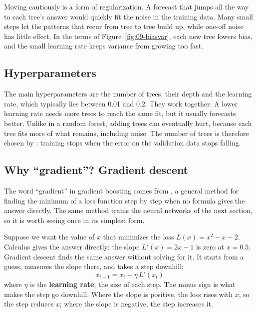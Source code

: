 Moving cautiously is a form of regularization. A forecast that jumps all the way to each tree's answer would quickly fit the noise in the training data. Many small steps let the patterns that recur from tree to tree build up, while one-off noise has little effect. In the terms of Figure~\ref{fig:09-biasvar}, each new tree lowers bias, and the small learning rate keeps variance from growing too fast.

\subsection{Hyperparameters}

The main hyperparameters are the number of trees, their depth and the learning rate, which typically lies between 0.01 and 0.2. They work together. A lower learning rate needs more trees to reach the same fit, but it usually forecasts better. Unlike in a random forest, adding trees can eventually hurt, because each tree fits more of what remains, including noise. The number of trees is therefore chosen by : training stops when the error on the validation data stops falling.

\subsection{Why ``gradient''? Gradient descent}

The word ``gradient'' in gradient boosting comes from , a general method for finding the minimum of a loss function step by step when no formula gives the answer directly. The same method trains the neural networks of the next section, so it is worth seeing once in its simplest form.

Suppose we want the value of $x$ that minimizes the loss $L(x) = x^2 - x - 2$. Calculus gives the answer directly: the slope $L'(x) = 2x - 1$ is zero at $x = 0.5$. Gradient descent finds the same answer without solving for it. It starts from a guess, measures the slope there, and takes a step downhill:
\begin{equation}
  x_{t+1} = x_t - \eta \, L'(x_t)
  \label{eq:20-gd}
\end{equation}
where $\eta$ is the \textbf{learning rate}, the size of each step. The minus sign is what makes the step go downhill. Where the slope is positive, the loss rises with $x$, so the step reduces $x$; where the slope is negative, the step increases it.

